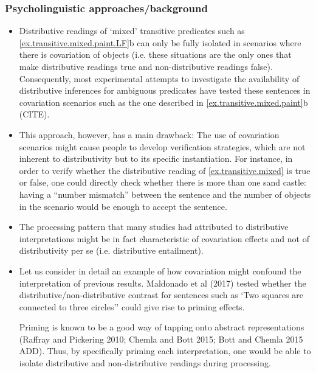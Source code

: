 \documentclass[a4paper]{article}
\newcommand{\addMM}[1]{{\leavevmode\color{red}#1}}
\begin{document}
\subsubsection*{Psycholinguistic approaches/background}

\begin{itemize}

\item Distributive readings of `mixed' transitive predicates such as \ref{ex.transitive.mixed.paint.LF}b can only be fully isolated in scenarios where there is covariation of objects (i.e. these situations are the only ones that make distributive readings true and non-distributive readings false). 
Consequently, most experimental attempts to investigate the availability of distributive inferences for ambiguous predicates have tested these sentences in covariation scenarios such as the one described in \ref{ex.transitive.mixed.paint}b (CITE).

\item This approach, however, has a main drawback: The use of covariation scenarios might cause people to develop verification strategies, which are not inherent to distributivity but to its specific instantiation. For instance, in order to verify whether the distributive reading of \ref{ex.transitive.mixed} is true or false, one could directly check whether there is more than one sand castle: having a ``number mismatch'' between the sentence and the number of objects in the scenario would be enough to accept the sentence. 

\item The processing pattern that many studies had attributed to distributive interpretations might be in fact characteristic of covariation effects and not of distributivity per se (i.e. distributive entailment). 

\item Let us consider in detail an example of how covariation might confound the interpretation of previous results. Maldonado et al (2017) tested whether the distributive/non-distributive contrast for sentences such as `Two squares are connected to three circles'' could give rise to priming effects. 

\addMM{Priming is known to be a good way of tapping onto abstract representations (Raffray and Pickering 2010; Chemla and Bott 2015; Bott and Chemla 2015 \addMM{ADD}). Thus, by specifically priming each interpretation, one would be able to isolate distributive and non-distributive readings during processing.} 


\end{itemize}
\end{document}
